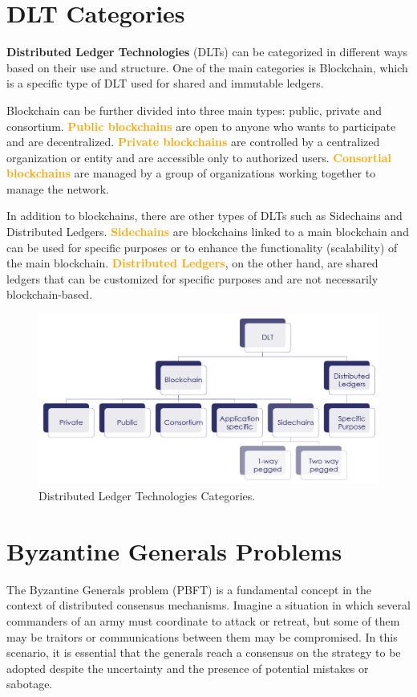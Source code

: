 \section{DLT Categories}
\textbf{Distributed Ledger Technologies} (DLTs) can be categorized in different ways based on their use and structure. One of the main categories is Blockchain, which is a specific type of DLT used for shared and immutable ledgers.

Blockchain can be further divided into three main types: public, private and consortium. \textbf{\textcolor{Orange}{Public blockchains}} are open to anyone who wants to participate and are decentralized. \textbf{\textcolor{Orange}{Private blockchains}} are controlled by a centralized organization or entity and are accessible only to authorized users. \textbf{\textcolor{Orange}{Consortial blockchains}} are managed by a group of organizations working together to manage the network.

In addition to blockchains, there are other types of DLTs such as Sidechains and Distributed Ledgers. \textbf{\textcolor{Orange}{Sidechains}} are blockchains linked to a main blockchain and can be used for specific purposes or to enhance the functionality (scalability) of the main blockchain. \textbf{\textcolor{Orange}{Distributed Ledgers}}, on the other hand, are shared ledgers that can be customized for specific purposes and are not necessarily blockchain-based.

\begin{figure}[h]
\centering\includegraphics[scale=0.3]{images/chapter3 - DLT.png}
\caption{Distributed Ledger Technologies Categories.}
\end{figure}

\section{Byzantine Generals Problems}
The Byzantine Generals problem (PBFT) is a fundamental concept in the context of distributed consensus mechanisms. Imagine a situation in which several commanders of an army must coordinate to attack or retreat, but some of them may be traitors or communications between them may be compromised. In this scenario, it is essential that the generals reach a consensus on the strategy to be adopted despite the uncertainty and the presence of potential mistakes or sabotage.

